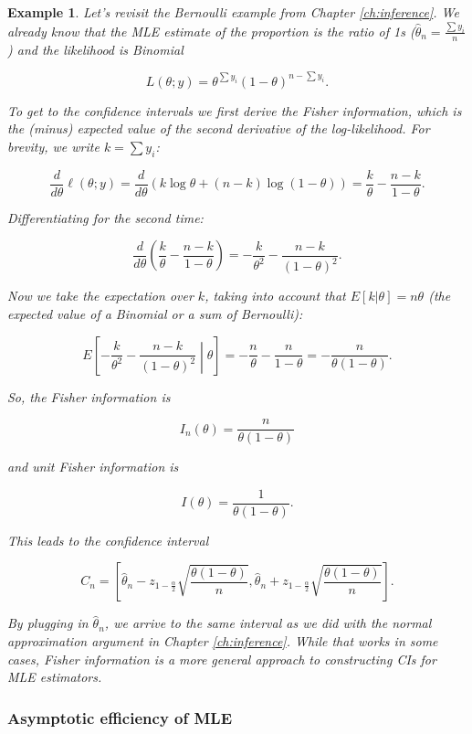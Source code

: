 \documentclass{book}
\theoremstyle{plain}%
\newtheorem{prototheorem}{Example}[section]
\newenvironment{cexample}
   {\colorlet{shadecolor}{gray!10}\begin{shaded}\begin{prototheorem}}
   {\end{prototheorem}\end{shaded}}
\theoremstyle{definition}
\begin{document}
\begin{cexample}{}{}

Let's revisit the Bernoulli example from Chapter \ref{ch:inference}. We already know that the MLE estimate of the proportion is the ratio of 1s ($\hat{\theta}_n = \frac{\sum y_i}{n}$) and the likelihood is Binomial

$$L(\theta; y) = \theta^{\sum y_i} (1 - \theta)^{n - \sum y_i}.$$

To get to the confidence intervals we first derive the Fisher information, which is the (minus) expected value of the second derivative of the log-likelihood. For brevity, we write $k = \sum y_i$:

$$\frac{d}{d\theta} \ell(\theta; y) = \frac{d}{d\theta} \left(k \log \theta + (n - k) \log (1-\theta)\right) = \frac{k}{\theta} - \frac{n - k}{1 - \theta}.$$

Differentiating for the second time:

$$\frac{d}{d\theta} \left(\frac{k}{\theta} - \frac{n - k}{1 - \theta}\right) = -\frac{k}{\theta^2} - \frac{n - k}{(1 - \theta)^2}.$$

Now we take the expectation over $k$, taking into account that $E[k|\theta] = n\theta$ (the expected value of a Binomial or a sum of Bernoulli):

$$E\left[-\frac{k}{\theta^2} - \frac{n - k}{(1 - \theta)^2}\middle|\theta\right] = -\frac{n}{\theta} -\frac{n}{1 - \theta} = -\frac{n}{\theta(1-\theta)}.$$

So, the Fisher information is 

$$I_n(\theta) = \frac{n}{\theta(1-\theta)}$$

and unit Fisher information is

$$I(\theta) = \frac{1}{\theta(1-\theta)}.$$

This leads to the confidence interval

$$C_n = \left[\hat{\theta}_n - z_{1 - \frac{\alpha}{2}}\sqrt{\frac{\theta(1-\theta)}{n}},\hat{\theta}_n + z_{1 - \frac{\alpha}{2}}\sqrt{\frac{\theta(1-\theta)}{n}}\right].$$

By plugging in $\hat{\theta}_n$, we arrive to the same interval as we did with the normal approximation argument in Chapter \ref{ch:inference}. While that works in some cases, Fisher information is a more general approach to constructing CIs for MLE estimators.
\end{cexample}


\subsubsection*{Asymptotic efficiency of MLE}
\end{document}
